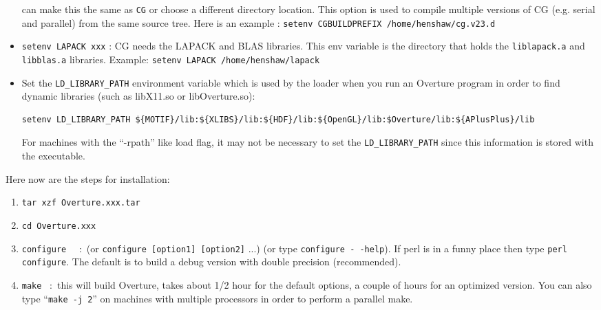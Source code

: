 \documentclass{article}
\begin{document}
\begin{itemize}
           can make this the same as {\tt CG} or choose a different directory location. This option is used
           to compile multiple versions of CG (e.g. serial and parallel) from the same source tree. 
              Here is an example : {\tt setenv CGBUILDPREFIX /home/henshaw/cg.v23.d}
   \item {\tt setenv LAPACK xxx} : CG needs the LAPACK and BLAS libraries. This env variable is the
           directory that holds the {\tt liblapack.a} and {\tt libblas.a} libraries. 
           Example: {\tt setenv LAPACK /home/henshaw/lapack}
    \item Set the {\tt LD\_LIBRARY\_PATH} environment variable which is used by the loader when you run an Overture
   program in order to find dynamic libraries (such as libX11.so or libOverture.so):
{\footnotesize
\begin{verbatim}
setenv LD_LIBRARY_PATH ${MOTIF}/lib:${XLIBS}/lib:${HDF}/lib:${OpenGL}/lib:$Overture/lib:${APlusPlus}/lib
\end{verbatim}
}
    For machines with the ``-rpath'' like load flag, it may not be necessary to set the {\tt LD\_LIBRARY\_PATH}
    since this information is stored with the executable. 
\end{itemize}

\noindent Here now are the steps for installation:
\begin{enumerate}
    \item {\tt tar xzf Overture.xxx.tar}
    \item {\tt cd Overture.xxx}
    \item {\tt configure} ~~:~(or {\tt configure [option1] [option2]} ...) (or type {\tt configure -\,-help}).
          If perl is in a funny place then type {\tt perl configure}. The default is to build a debug version
          with double precision (recommended). 
    \item {\tt make} ~:~this will build Overture, takes about 1/2 hour for the default options, a couple of hours
                 for an optimized version. You can also type ``{\tt make -j 2}'' on machines with multiple processors
                 in order to perform a parallel make.
\end{enumerate}
\end{document}
